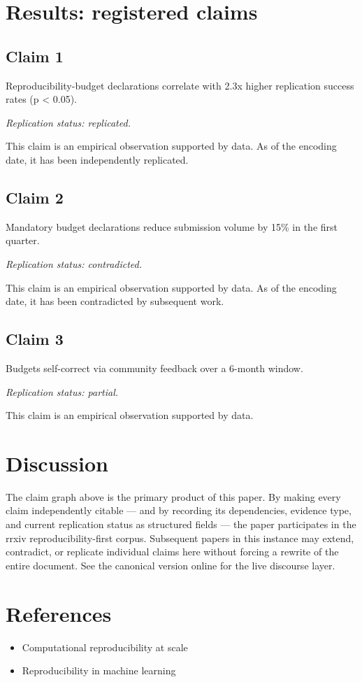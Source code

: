 \documentclass{rrxiv}
\begin{document}
\section{Results: registered claims}
\subsection*{Claim 1}
\begin{claim}[Claim 1]
\label{claim:c1}
Reproducibility-budget declarations correlate with 2.3x higher replication success rates (p \textless{} 0.05).

\emph{Replication status: replicated.}
\end{claim}
This claim is an empirical observation supported by data. As of the encoding date, it has been independently replicated.

\subsection*{Claim 2}
\begin{claim}[Claim 2]
\label{claim:c2}
Mandatory budget declarations reduce submission volume by 15\% in the first quarter.

\emph{Replication status: contradicted.}
\end{claim}
This claim is an empirical observation supported by data. As of the encoding date, it has been contradicted by subsequent work.

\subsection*{Claim 3}
\begin{claim}[Claim 3]
\label{claim:c3}
Budgets self-correct via community feedback over a 6-month window.

\emph{Replication status: partial.}
\end{claim}
This claim is an empirical observation supported by data.

\section{Discussion}
The claim graph above is the primary product of this paper. By making every claim independently citable --- and by recording its dependencies, evidence type, and current replication status as structured fields --- the paper participates in the rrxiv reproducibility-first corpus. Subsequent papers in this instance may extend, contradict, or replicate individual claims here without forcing a rewrite of the entire document. See the canonical version online for the live discourse layer.

\section{References}
\begin{itemize}[leftmargin=*]
\item Computational reproducibility at scale
\item Reproducibility in machine learning
\end{itemize}
\end{document}
